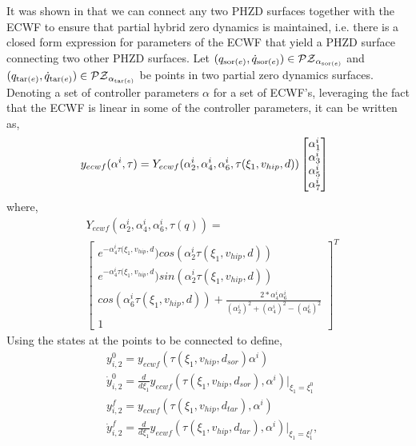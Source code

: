 It was shown in \cite{PHA2013} that we can connect any two PHZD surfaces together with the ECWF to ensure that partial hybrid zero dynamics is maintained, i.e. there is a closed form expression for parameters of the ECWF that yield a PHZD surface connecting two other PHZD surfaces. Let $(q_{\text{sor($e$)}}, \dot {q}_{\text{sor($e$)}}) \in \mathcal{PZ}_{\alpha_{\text{sor($e$)}}}$ and $(q_{\text{tar($e$)}}, \dot {q}_{\text{tar($e$)}}) \in \mathcal{PZ}_{\alpha_{{\text{tar($e$)}}}}$ be points in two partial zero dynamics surfaces.
Denoting a set of controller parameters $\alpha$ for a set of ECWF's, leveraging the fact that the ECWF is linear in some of the controller parameters, it can be written as,
\begin{align}
\hspace{-2mm} y_{ecwf}(\alpha^{i},\tau) = Y_{ecwf}(\alpha^{i}_{2},\alpha^{i}_{4},\alpha^{i}_{6},\tau(\xi_{1},v_{hip},d))
\begin{bmatrix}
\alpha^{i}_{1} \\
\alpha^{i}_{3} \\
\alpha^{i}_{5} \\
\alpha^{i}_{7}
\end{bmatrix}
\end{align}
where,
\begin{align}
& Y_{ecwf}(\alpha^{i}_{2},\alpha^{i}_{4},\alpha^{i}_{6},\tau(q)) = \\
& \begin{bmatrix}
e^{-\alpha^{i}_{4}\tau(\xi_{1},v_{hip},d})cos(\alpha^{i}_{2}\tau(\xi_{1},v_{hip},d)) \\
e^{-\alpha^{i}_{4}\tau(\xi_{1},v_{hip},d})sin(\alpha^{i}_{2}\tau(\xi_{1},v_{hip},d)) \\
cos(\alpha^{i}_{6}\tau(\xi_{1},v_{hip},d))+\frac{2*\alpha^{i}_{4}\alpha^{i}_{6}}{(\alpha^{i}_{2})^{2}
+(\alpha^{i}_{4})^{2}-(\alpha^{i}_{6})^{2}} \\
1
\end{bmatrix}^{T} \nonumber
\end{align}
Using the states at the points to be connected to define,
\begin{align}
& y^{0}_{i,2} = y_{ecwf}(\tau(\xi_{1},v_{hip},d_{sor})\alpha^{i}) \\
& \dot{y}^{0}_{i,2} = \frac{d}{d\xi_{1}}y_{ecwf}(\tau(\xi_{1},v_{hip},d_{sor}),\alpha^{i})\Big|_{\xi_{1}=\xi^{0}_{1}} \\
& y^{f}_{i,2} = y_{ecwf}(\tau(\xi_{1},v_{hip},d_{tar}),\alpha^{i}) \\
& \dot{y}^{f}_{i,2} = \frac{d}{d\xi_{1}}y_{ecwf}(\tau(\xi_{1},v_{hip},d_{tar}),\alpha^{i})\Big|_{\xi_{1}=\xi^{f}_{1}},
\end{align}
